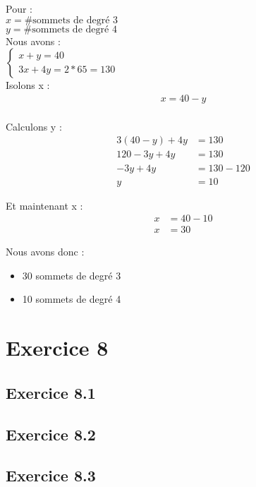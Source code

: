\documentclass[fontsize=10pt]{article}
\begin{document}
Pour :\\
$x = \#\text{sommets de degré } 3$\\
$y = \#\text{sommets de degré } 4$\\

Nous avons :\\
$\begin{cases}
    x + y = 40\\
    3x + 4y = 2 * 65 = 130
\end{cases}$\\

Isolons x :
\vspace{-.8em}
\begin{align*}
x = 40 - y\\
\end{align*}
\vspace{-3em}

Calculons y :
\vspace{-.8em}
\begin{align*}
    3(40 - y) + 4y &= 130\\
    120 - 3y + 4y &= 130\\
    -3y + 4y &= 130 - 120\\
    y &= 10
\end{align*}

Et maintenant x :
\vspace{-.8em}
\begin{align*}
x &= 40 - 10\\
x &= 30
\end{align*}

Nous avons donc :
\begin{itemize}
    \itemsep0em
    \item 30 sommets de degré 3
    \item 10 sommets de degré 4
\end{itemize}


\section*{Exercice 8}
\subsection*{Exercice 8.1}
\subsection*{Exercice 8.2}
\subsection*{Exercice 8.3}
\end{document}
